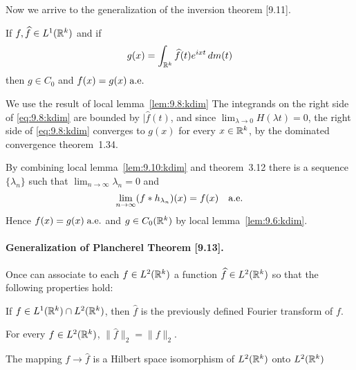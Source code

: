 \begin{enumerate}
Now we arrive to the generalization of the inversion theorem [9.11].
\begin{llem} \label{lem:9.11:kdim}
If \(f,\widehat{f}\in L^1(\mathbb{R}^k)\) and if 
\begin{equation*}
g(x) = \int_{\mathbb{R}^k} \widehat{f}(t)e^{ixt}\,dm(t)
\end{equation*}
then \(g\in C_0\) and \(f(x)=g(x)\;\textrm{a.e.}\)
\end{llem}
\begin{thmproof}
We use the result of local lemma~\ref{lem:9.8:kdim} 
The integrands on the right side of \eqref{eq:9.8:kdim} are bounded
by \(|\widehat{f}(t)\), and since \(\lim_{\lambda\to 0} H(\lambda t) = 0\),
the right side of \eqref{eq:9.8:kdim} converges to \(g(x)\)
for every \(x\in\mathbb{R}^k\), by the dominated convergence theorem~1.34.

By combining local lemma~\ref{lem:9.10:kdim} and theorem~3.12
there is a sequence \(\{\lambda_n\}\) 
such that \(\lim_{n\to\infty}\lambda_n=0\) and 
\begin{equation*}
\lim_{n\to\infty} (f\ast h_{\lambda_n})(x) = f(x)\quad\textrm{a.e.}
\end{equation*}
Hence \(f(x)=g(x)\;\textrm{a.e.}\)
and \(g\in C_0(\mathbb{R}^k)\) by local lemma~\ref{lem:9.6:kdim}.
\end{thmproof}

\paragraph{Generalization of Plancherel Theorem [9.13].}
\begin{llem}
Once can associate to each \(f\in L^2(\mathbb{R}^k)\) a function
\(\widehat{f}\in L^2(\mathbb{R}^k)\) so that the following properties hold:
\begin{itemize}

If \(f \in L^1(\mathbb{R}^k)\cap L^2(\mathbb{R}^k)\), 
then \(\widehat{f}\) is the previously defined Fourier transform of $f$.

For every \(f \in L^2(\mathbb{R}^k)\), \(\|\widehat{f}\|_2 = \|f\|_2\).

The mapping \(f \to \widehat{f}\) is a 
Hilbert space isomorphism of \(L^2(\mathbb{R}^k)\) onto \(L^2(\mathbb{R}^k)\)


\end{itemize}
\end{llem}
\end{enumerate}
